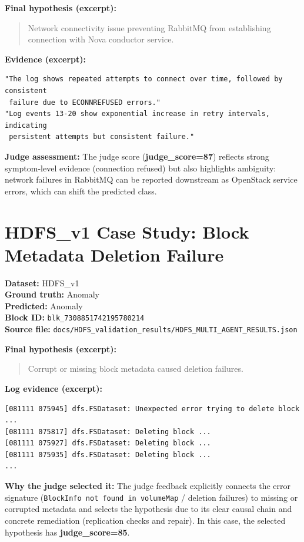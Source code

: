 \textbf{Final hypothesis (excerpt):}
\begin{quote}
Network connectivity issue preventing RabbitMQ from establishing connection with Nova conductor
service.
\end{quote}

\textbf{Evidence (excerpt):}
\begin{lstlisting}
"The log shows repeated attempts to connect over time, followed by consistent
 failure due to ECONNREFUSED errors."
"Log events 13-20 show exponential increase in retry intervals, indicating
 persistent attempts but consistent failure."
\end{lstlisting}

\textbf{Judge assessment:}
The judge score (\textbf{judge\_score=87}) reflects strong symptom-level evidence (connection
refused) but also highlights ambiguity: network failures in RabbitMQ can be reported downstream
as OpenStack service errors, which can shift the predicted class.

\section{HDFS\_v1 Case Study: Block Metadata Deletion Failure}
\textbf{Dataset:} HDFS\_v1\\
\textbf{Ground truth:} Anomaly\\
\textbf{Predicted:} Anomaly\\
\textbf{Block ID:} \texttt{blk\_7308851742195780214}\\
\textbf{Source file:} \texttt{docs/HDFS\_validation\_results/HDFS\_MULTI\_AGENT\_RESULTS.json}

\textbf{Final hypothesis (excerpt):}
\begin{quote}
Corrupt or missing block metadata caused deletion failures.
\end{quote}

\textbf{Log evidence (excerpt):}
\begin{lstlisting}
[081111 075945] dfs.FSDataset: Unexpected error trying to delete block ...
[081111 075817] dfs.FSDataset: Deleting block ...
[081111 075927] dfs.FSDataset: Deleting block ...
[081111 075935] dfs.FSDataset: Deleting block ...
...
\end{lstlisting}

\textbf{Why the judge selected it:}
The judge feedback explicitly connects the error signature (\texttt{BlockInfo not found in
volumeMap} / deletion failures) to missing or corrupted metadata and selects the hypothesis due
to its clear causal chain and concrete remediation (replication checks and repair). In this case,
the selected hypothesis has \textbf{judge\_score=85}.
